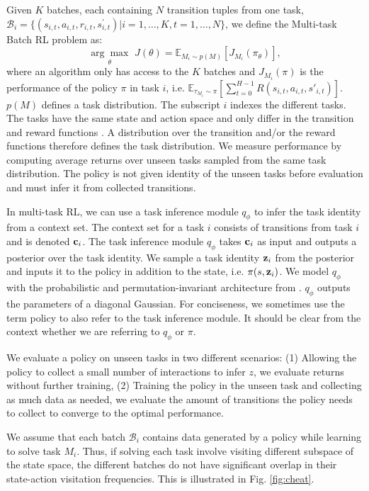 Given $K$ batches, each containing $N$ transition tuples from one task,
$\mathcal{B}_{i}=\{(s_{i, t}, a_{i, t}, r_{i, t}, s_{i, t}^{\prime}) | i = 1, \ldots, K, t=1, \ldots, N \}$,
we define the Multi-task Batch RL problem as:
\begin{equation}\label{eq_obj}
    \underset{\theta}{\arg \max } \,\, J(\theta)=\mathbb{E}_{M_{i} \sim p\left(M\right)}\left[ J_{M_i}(\pi_\theta)\right],
\end{equation}
where an algorithm only has access to the $K$ batches and $J_{M_i}(\pi)$ is the performance of the policy $\pi$ in task $i$, i.e. $\mathbb{E}_{\tau_{M_i} \sim \pi}[\sum_{t=0}^{H-1} R(s_{i, t}, a_{i, t}, s'_{i, t})]$. $p(M)$ defines a task distribution. The subscript $i$ indexes the different tasks. The tasks
have the same state and action space and
only differ in the transition and reward functions \cite{zintgraf2020varibad}. A distribution over the transition and/or the reward functions therefore defines the task distribution. We measure performance by computing average returns over unseen tasks sampled from the same task distribution. The policy is not given identity of the unseen tasks before evaluation and must infer it from collected transitions.

In multi-task RL, we can use a task inference module $q_\phi$ to infer the task identity from a context set. The context set for a task $i$ consists of transitions from task $i$ and is denoted ${\bf c}_i$.
The task inference module $q_\phi$ takes ${\bf c}_i$ as input and outputs a posterior over the task identity. We sample a task identity ${\bf z}_i$ from the posterior and inputs it to the policy in addition to the state, i.e. $\pi(s, {\bf z}_i)$.
We model $q_\phi$ with the probabilistic and permutation-invariant architecture from \cite{rakelly2019efficient}. $q_\phi$ outputs the parameters of a diagonal Gaussian. For conciseness, we sometimes use the term policy to also refer to the task inference module. It should be clear from the context whether we are referring to $q_\phi$ or $\pi$.

We evaluate a policy on unseen tasks in two different scenarios: (1) Allowing the policy to collect a small number of interactions to infer $z$, we evaluate returns without further training, (2) Training the policy in the unseen task and collecting as much data as needed, we evaluate the amount of transitions the policy needs to collect to converge to the optimal performance.

We assume that each batch $\mathcal{B}_{i}$ contains data generated by a policy while learning to solve task $M_{i}$. Thus, if solving each task involve visiting different subspace of the state space, the different batches do not have significant overlap in their state-action visitation frequencies. This is illustrated in Fig. \ref{fig:cheat}.
